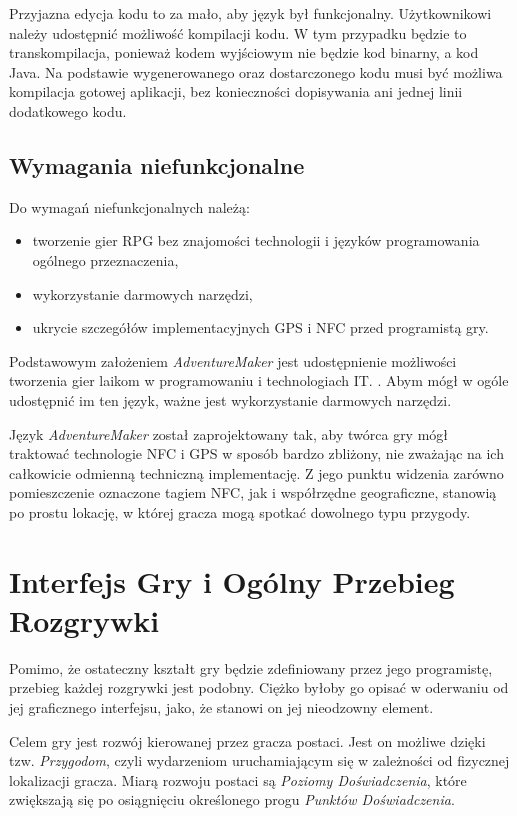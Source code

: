 \documentclass[openright]{xmgr}
\begin{document}
Przyjazna edycja kodu to za mało, aby język był funkcjonalny. Użytkownikowi należy udostępnić możliwość kompilacji kodu. W tym przypadku będzie to transkompilacja, ponieważ kodem wyjściowym nie będzie kod binarny, a kod Java. Na podstawie wygenerowanego oraz dostarczonego kodu musi być możliwa kompilacja gotowej aplikacji, bez konieczności dopisywania ani jednej linii dodatkowego kodu. 

\section{Wymagania niefunkcjonalne}
Do wymagań niefunkcjonalnych należą:
\begin{itemize}
	\item tworzenie gier RPG bez znajomości technologii i języków programowania ogólnego przeznaczenia,
	\item wykorzystanie darmowych narzędzi,
	\item ukrycie szczegółów implementacyjnych GPS i NFC przed programistą gry.
\end{itemize}

Podstawowym założeniem \textit{AdventureMaker} jest udostępnienie możliwości tworzenia gier laikom w programowaniu i technologiach IT. . Abym mógł w ogóle udostępnić im ten język, ważne jest wykorzystanie darmowych narzędzi.

Język \textit{AdventureMaker} został zaprojektowany tak, aby twórca gry mógł traktować technologie NFC i GPS w sposób bardzo zbliżony, nie zważając na ich  całkowicie odmienną techniczną implementację. Z jego punktu widzenia zarówno pomieszczenie oznaczone tagiem NFC, jak i współrzędne geograficzne, stanowią po prostu lokację, w której gracza mogą spotkać dowolnego typu przygody. 

\chapter{Interfejs Gry i Ogólny Przebieg Rozgrywki}

Pomimo, że ostateczny kształt gry będzie zdefiniowany przez jego programistę, przebieg każdej rozgrywki jest podobny. Ciężko byłoby go opisać w oderwaniu od jej graficznego interfejsu, jako, że stanowi on jej nieodzowny element. 

Celem gry jest rozwój kierowanej przez gracza postaci. Jest on możliwe dzięki tzw. \textit{Przygodom}, czyli wydarzeniom uruchamiającym się w zależności od fizycznej lokalizacji gracza. Miarą rozwoju postaci są \textit{Poziomy Doświadczenia}, które zwiększają się po osiągnięciu określonego progu \textit{Punktów Doświadczenia}.
\end{document}

